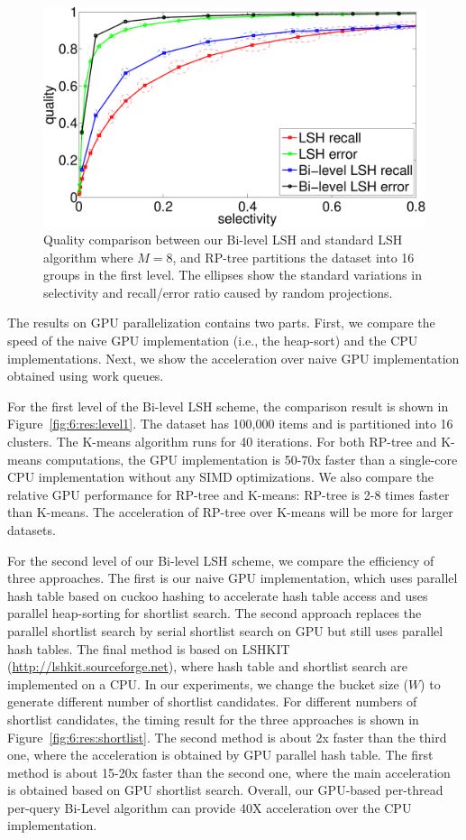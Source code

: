 \begin{figure}[t]
  \centering
  \includegraphics[width=0.8\linewidth]{figs/6/res/compare_L20_mh.pdf}
  \caption[Quality comparison between Bi-level LSH and standard LSH algorithm]{\label{fig:6:res:quality} Quality comparison between our Bi-level LSH and standard LSH algorithm where $M = 8$, and RP-tree partitions the dataset into 16 groups in the first level. The ellipses show the standard variations in selectivity and recall/error ratio caused by random projections.}
\end{figure}

The results on GPU parallelization contains two parts. First, we compare the speed of the naive GPU implementation (i.e., the heap-sort) and the CPU implementations. Next, we show the acceleration over naive GPU implementation obtained using work queues.

For the first level of the Bi-level LSH scheme, the comparison result is shown in Figure~\ref{fig:6:res:level1}. The dataset has 100,000 items and is partitioned into 16 clusters. The K-means algorithm runs for 40 iterations.
For both RP-tree and K-means computations, the GPU implementation is 50-70x faster than a single-core CPU implementation without any SIMD optimizations. We also compare the relative GPU performance for RP-tree and K-means: RP-tree is 2-8 times faster than K-means. The acceleration of RP-tree over K-means will be more for larger datasets.

For the second level of our Bi-level LSH scheme, we compare the efficiency of three approaches. The first is our naive GPU implementation, which uses parallel hash table based on cuckoo hashing to accelerate hash table access and uses parallel heap-sorting for shortlist search. The second approach replaces the parallel shortlist search by serial shortlist search on GPU but still uses parallel hash tables. The final method is based on LSHKIT (\url{http://lshkit.sourceforge.net}), where hash table and shortlist search are implemented on a CPU. In our experiments, we change the bucket size ($W$) to generate different number of shortlist candidates. For different numbers of shortlist candidates, the timing result for the three approaches is shown in Figure~\ref{fig:6:res:shortlist}. The second method is about 2x faster than the third one, where the acceleration is obtained by GPU parallel hash table. The first method is about 15-20x faster than the second one, where the main acceleration is obtained based on GPU shortlist search. Overall, our GPU-based per-thread per-query Bi-Level algorithm can provide 40X acceleration over the CPU implementation.

